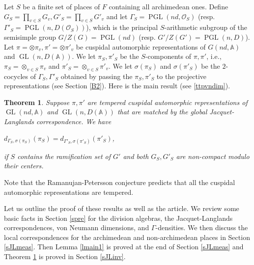 \documentclass[11pt]{article}
\theoremstyle{plain}
\newtheorem{theorem}{Theorem}[section]
\theoremstyle{remark}
\theoremstyle{definition}
\DeclareMathOperator{\GL}{GL}
\DeclareMathOperator{\PGL}{PGL}
\DeclareMathOperator{\ram}{Ram}
\begin{document}
Let $S$ be a finite set of places of $F$ containing all archimedean ones. 
Define $G_S=\prod_{v\in S}G_v,G'_S=\prod_{v\in S}G'_v$ and
let $\Gamma_S=\PGL(nd,\mathcal{O}_S)$ (resp. $\Gamma'_S=\PGL(n,D(\mathcal{O}_S))$), which is the principal $S$-arithmetic subgroup of the semisimple group $G/Z(G)=\PGL(nd)$ (resp. $G'/Z(G')=\PGL(n,D)$).
Let $\pi=\otimes \pi_v,\pi'=\otimes \pi'_v$ be cuspidal automorphic representations of $G(nd,\mathbb{A})$ and $\GL(n,D(\mathbb{A}))$.
We let $\pi_S,\pi'_S$ be the $S$-components of $\pi,\pi'$, i.e., $\pi_S=\otimes_{v\in S}\pi_v$ and  $\pi'_S=\otimes_{v\in S}\pi'_v$. 
We let $\sigma(\pi_S)$ and $\sigma(\pi'_S)$ be the $2$-cocycles of $\Gamma_S,\Gamma'_S$ obtained by passing the $\pi_S,\pi'_S$ to the projective representations (see Section \ref{B2}). 
Here is the main result (see \ref{ttpvndim}). 
\begin{theorem}\label{tmain2}
Suppose $\pi,\pi'$ are tempered cuspidal automorphic representations of $\GL(nd,\mathbb{A})$ and $\GL(n,D(\mathbb{A}))$ that are matched by the global Jacquet-Langlands correspondence.   
We have
\begin{center}
    $d_{\Gamma_S,\sigma(\pi_S)}(\pi_S)=d_{\Gamma'_S,\sigma(\pi'_S)}(\pi'_S)$, 
\end{center}
if $S$ contains the ramification set of $G'$ and both $G_S,G'_S$ are non-compact modulo their centers. 
\end{theorem}

Note that the Ramanujan-Petersson conjecture predicts that all the cuspidal automorphic representations are tempered.

Let us outline the proof of these results as well as the article. 
We review some basic facts in Section \ref{spre} for the division algebras, the Jacquet-Langlands correspondences, von Neumann dimensions, and $\Gamma$-densities.  
We then discuss the local correspondences for the archimedean and non-archimedean places in Section \ref{sJLmeas}. 
Then Lemma \ref{lmain1} is proved at the end of Section \ref{sJLmeas} and Theorem \ref{tmain2} is proved in Section \ref{sJLinv}.  
\end{document}
